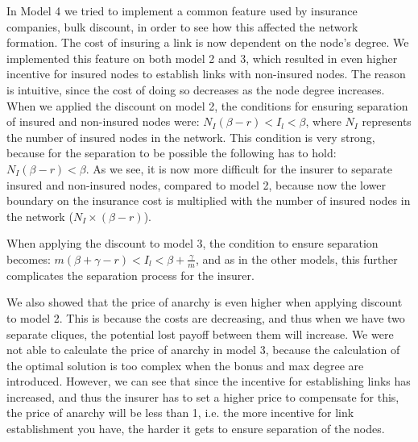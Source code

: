 In Model 4 we tried to implement a common feature used by insurance companies, bulk discount, in order to see how this affected the network formation. The cost of insuring a link is now dependent on the node's degree. 
We implemented this feature on both model 2 and 3, which resulted in even higher incentive for insured nodes to establish links with non-insured nodes. The reason is intuitive, since the cost of doing so decreases as the node degree increases. 
When we applied the discount on model 2, the conditions for ensuring separation of insured and non-insured nodes were: $N_{I}(\beta-r)<I_{l}<\beta$, where $N_{I}$ represents the number of insured nodes in the network. This condition is very strong, because for the separation to be possible the following has to hold: $N_{I}(\beta-r)<\beta$. As we see, it is now more difficult for the insurer to separate insured and non-insured nodes, compared to model 2, because now the lower boundary on the insurance cost is multiplied with the number of insured nodes in the network ($N_{I}\times(\beta-r)$).

When applying the discount to model 3, the condition to ensure separation becomes: $m(\beta+\gamma-r)<I_{l}<\beta+\frac{\gamma}{m}$, and as in the other models, this further complicates the separation process for the insurer. 

We also showed that the price of anarchy is even higher when applying discount to model 2. This is because the costs are decreasing, and thus when we have two separate cliques, the potential lost payoff between them will increase.
We were not able to calculate the price of anarchy in model 3, because the calculation of the optimal solution is too complex when the bonus and max degree are introduced. However, we can see that since the incentive for establishing links has increased, and thus the insurer has to set a higher price to compensate for this, the price of anarchy will be less than 1, i.e. the more incentive for link establishment you have, the harder it gets to ensure separation of the nodes.  

